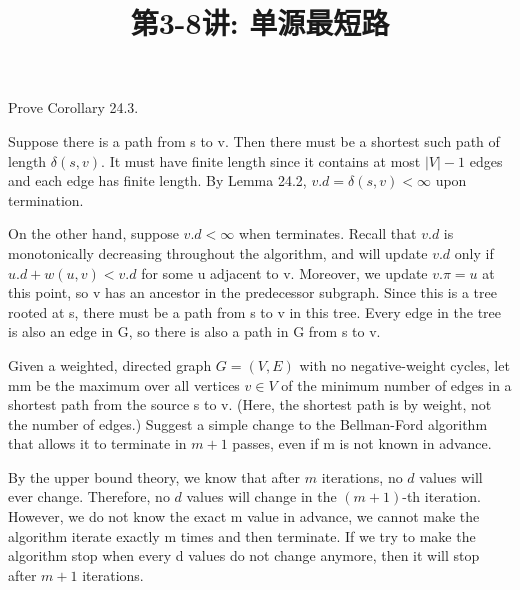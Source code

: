 \documentclass[a4paper, justified]{tufte-handout}
\title{第3-8讲: 单源最短路}
\date{\zhtoday} %
\begin{document}
\maketitle
\noplagiarism %
\begin{abstract}
\end{abstract}
\beginrequired

\begin{problem}[TC 24.1-2]
Prove Corollary 24.3.
\end{problem}

\begin{solution}
	Suppose there is a path from s to v. Then there must be a shortest such path of length $\delta(s, v)$. It must have finite length since it contains at most $|V| - 1$ edges and each edge has finite length. By Lemma 24.2, $v.d = \delta(s, v) < \infty$ upon termination.

	On the other hand, suppose $v.d < \infty$ when  terminates. Recall that $v.d$ is monotonically decreasing throughout the algorithm, and  will update $v.d$ only if $u.d + w(u, v) < v.d$ for some u adjacent to v. Moreover, we update $v.\pi = u$ at this point, so v has an ancestor in the predecessor subgraph. Since this is a tree rooted at s, there must be a path from s to v in this tree. Every edge in the tree is also an edge in G, so there is also a path in G from s to v.
\end{solution}

\begin{problem}[TC 24.1-3]
Given a weighted, directed graph $G = (V, E)$ with no negative-weight cycles, let mm be the maximum over all vertices $v \in V$ of the minimum number of edges in a shortest path from the source s to v. (Here, the shortest path is by weight, not the number of edges.) Suggest a simple change to the Bellman-Ford algorithm that allows it to terminate in $m + 1$ passes, even if m is not known in advance.
\end{problem}

\begin{solution}
	By the upper bound theory, we know that after $m$ iterations, no $d$ values will ever change. Therefore, no $d$ values will change in the $(m + 1)$-th iteration. However, we do not know the exact m value in advance, we cannot make the algorithm iterate exactly m times and then terminate. If we try to make the algorithm stop when every d values do not change anymore, then it will stop after $m + 1$ iterations.
\end{solution}
\end{document}
